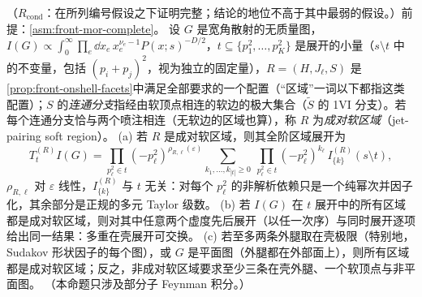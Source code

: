 \begin{proposition}\label{prop:front-commuting}
（$R_{\mathrm{cond}}$：在所列编号假设之下证明完整；结论的地位不高于其中最弱的假设。）前提：\cref{asm:front-mor-complete}。
设 $G$ 是宽角散射的无质量图，$I(G)\propto\int_0^\infty\prod_e\dd x_e\,x_e^{\nu_e-1}P(x;s)^{-D/2}$，$t\subseteq\{p_1^2,\dots,p_K^2\}$ 是展开的小量（$s\setminus t$ 中的不变量，包括 $(p_i+p_j)^2$，视为独立的固定量），$R=(H,J_\ell,S)$ 是\cref{prop:front-onshell-facets}中满足全部要求的一个配置（“区域”一词以下都指这类配置）；$S$ 的\emph{连通分支}指经由软顶点相连的软边的极大集合（$\tilde S$ 的 1VI 分支）。若每个连通分支恰与两个喷注相连（无软边的区域也算），称 $R$ 为\emph{成对软区域}（jet-pairing soft region）。
(a) 若 $R$ 是成对软区域，则其全阶区域展开为
\begin{equation}\label{eq:front-jet-pairing}
T^{(R)}_tI(G)=\prod_{p_\ell^2\in t}(-p_\ell^2)^{\rho_{R,\ell}(\varepsilon)}\sum_{k_1,\dots,k_{|t|}\ge0}\ \prod_{p_\ell^2\in t}(-p_\ell^2)^{k_\ell}\,I^{(R)}_{\{k\}}(s\setminus t),
\end{equation}
$\rho_{R,\ell}$ 对 $\varepsilon$ 线性，$I^{(R)}_{\{k\}}$ 与 $t$ 无关：对每个 $p_\ell^2$ 的非解析依赖只是一个纯幂次并因子化，其余部分是正规的多元 Taylor 级数。
(b) 若 $I(G)$ 在 $t$ 展开中的所有区域都是成对软区域，则对其中任意两个虚度先后展开（以任一次序）与同时展开逐项给出同一结果：多重在壳展开可交换。
(c) 若至多两条外腿取在壳极限（特别地，Sudakov 形状因子的每个图），或 $G$ 是平面图（外腿都在外部面上），则所有区域都是成对软区域；反之，非成对软区域要求至少三条在壳外腿、一个软顶点与非平面图。
（本命题只涉及部分子 Feynman 积分。）
\end{proposition}

